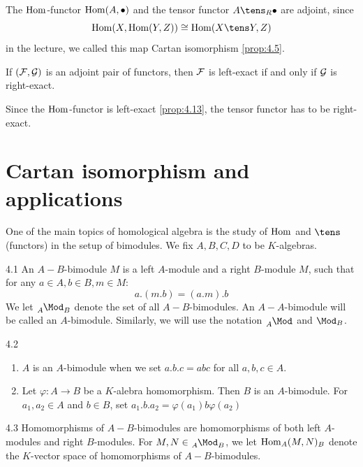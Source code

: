 \documentclass[twoside = false,	%
		headsepline,		%
		parskip = true,
		]{scrbook}						%
\begin{document}
        The $\mathrm{Hom}$-functor $\mathrm{Hom}(A,\bullet)$ and the tensor functor $A \tens_R \bullet$ are adjoint, since
        \begin{equation*}
            \Hom(X,\Hom(Y,Z)) \cong \Hom(X \tens Y, Z)
        \end{equation*}
        in the lecture, we called this map Cartan isomorphism \ref{prop:4.5}.
        
        \begin{lemma*}{}
            If $(\mathcal F,\mathcal G)$ is an adjoint pair of functors, then $\mathcal F$ is left-exact if and only if $\mathcal G$ is right-exact.
        \end{lemma*}
        
        Since the $\mathrm{Hom}$-functor is left-exact \ref{prop:4.13}, the tensor functor has to be right-exact. 
\section{Cartan isomorphism and applications}

    One of the main topics of homological algebra is the study of $\mathrm{Hom}$ and $\tens$ (functors) in the setup of bimodules. We fix $A,B,C,D$ to be $K$-algebras.

    \begin{definition}{}{4.1}
        An $A-B$-bimodule $M$ is a left $A$-module and a right $B$-module $M$, such that for any $a \in A, b \in B, m \in M$:
        \begin{equation*}
            a.(m.b) = (a.m).b
        \end{equation*}
        We let $\tensor[_A]{\Mod}{_B}$ denote the set of all $A-B$-bimodules. An $A-A$-bimodule will be called an $A$-bimodule. Similarly, we will use the notation $\tensor[_A]{\Mod}{^{}}$ and $\Mod_B$.
    \end{definition}

    \begin{example}{}{4.2}
        \begin{enumerate}
            \item $A$ is an $A$-bimodule when we set $a.b.c = abc$ for all $a,b,c \in A$.
            \item Let $\varphi: A \to B$ be a $K$-alebra homomorphism. Then $B$ is an $A$-bimodule. For $a_1,a_2 \in A$ and $b \in B$, set $a_1 . b . a_2 = \varphi(a_1) b \varphi(a_2)$
        \end{enumerate}
    \end{example}

    \begin{definition}{}{4.3}
        Homomorphisms of $A-B$-bimodules are homomorphisms of both left $A$-modules and right $B$-modules. For $M,N \in \tensor[_A]{\Mod}{_B}$, we let $\mathrm{Hom}_A(M,N)_B$ denote the $K$-vector space of homomorphisms of $A-B$-bimodules.
    \end{definition}
\end{document}
